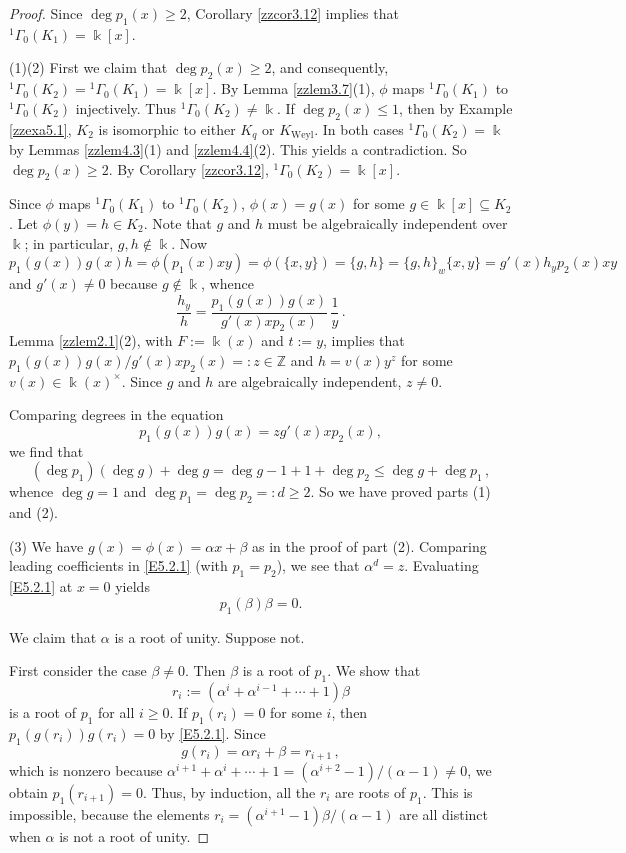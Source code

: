 \documentclass[12pt]{amsart}
\theoremstyle{plain}
\numberwithin{theorem}{section}
\numberwithin{equation}{theorem}
\theoremstyle{definition}
\newcommand{\ZZ}{\mathbb{Z}}
\DeclareMathOperator{\Weyl}{Weyl}
\newcommand \Kweyl {K_{\Weyl}}
\begin{document}
\begin{proof} 
Since $\deg p_1(x) \ge 2$, Corollary \ref{zzcor3.12} implies that 
${^1\Gamma}_{0}(K_1)=\Bbbk[x]$.

(1)(2) First we claim that $\deg p_2(x)\geq 2$, and consequently,
${^1\Gamma}_{0}(K_2)={^1\Gamma}_{0}(K_1)=\Bbbk[x]$.
By Lemma \ref{zzlem3.7}(1), $\phi$ maps 
${^1\Gamma}_{0}(K_1)$ to ${^1\Gamma}_0(K_2)$ injectively. 
Thus ${^1\Gamma}_{0}(K_2)\neq \Bbbk$. If $\deg p_2(x)\leq 1$,
then by Example \ref{zzexa5.1}, $K_2$ is isomorphic to either
$K_q$ or $\Kweyl$. In both cases ${^1\Gamma}_0(K_2)=\Bbbk$
by Lemmas \ref{zzlem4.3}(1) and \ref{zzlem4.4}(2). This 
yields a contradiction. So $\deg p_2(x)\geq 2$. By 
Corollary \ref{zzcor3.12}, ${^1\Gamma}_{0}(K_2)=\Bbbk[x]$.

Since $\phi$ maps ${^1\Gamma}_{0}(K_1)$ to ${^1\Gamma}_{0}(K_2)$, 
$\phi(x) = g(x)$ for some $g \in \Bbbk[x]\subseteq K_2$. 
Let $\phi(y)=h\in K_2$. Note that $g$ and $h$ must be 
algebraically independent over $\Bbbk$; in particular, 
$g,h \notin \Bbbk$. Now
$$p_1(g(x)) g(x) h = \phi(p_1(x) xy) = \phi(\{x,y\}) = \{g,h\} 
= \{g,h\}_w \{x,y\} = g'(x) h_y p_2(x) xy$$
and $g'(x) \ne 0$ because $g \notin \Bbbk$, whence
$$
\frac{h_y}{h} = \frac{p_1(g(x)) g(x)}{g'(x) x p_2(x)}\, \frac1y \,.
$$
Lemma \ref{zzlem2.1}(2), with $F := \Bbbk(x)$ and $t :=y$, 
implies that $p_1(g(x)) g(x)/ g'(x) x p_2(x) = :z \in \ZZ$ and 
$h = v(x) y^z$ for some $v(x) \in \Bbbk(x)^\times$. Since 
$g$ and $h$ are algebraically independent, $z \ne 0$.

Comparing degrees in the equation 
\begin{equation} 
\label{E5.2.1}\tag{E5.2.1}
p_1(g(x)) g(x) = z g'(x) x p_2(x),
\end{equation}
we find that
$$(\deg p_1)(\deg g) + \deg g = \deg g - 1 + 1 + \deg p_2\leq \deg g+\deg p_1 \,,$$
whence $\deg g = 1$ and $\deg p_1=\deg p_2=:d\geq 2$. So we have proved 
parts (1) and (2).

(3) We have $g(x) = \phi(x) = \alpha x + \beta$ as in the proof of part (2). Comparing leading coefficients in 
\eqref{E5.2.1} (with $p_1=p_2$), we see that $\alpha^d = z$. Evaluating \eqref{E5.2.1} at $x=0$ yields
$$p_1(\beta) \beta = 0.$$

We claim that $\alpha$ is a root of unity.  Suppose not.

First consider the case $\beta \ne 0$. Then $\beta$ is a root of 
$p_1$. We show that 
$$r_i := (\alpha^i + \alpha^{i-1} + \cdots + 1) \beta$$ 
is a root of $p_1$ for all $i \ge 0$. If $p_1(r_i) = 0$ for some $i$, 
then $p_1(g(r_i)) g(r_i) = 0$ by \eqref{E5.2.1}. Since 
$$g(r_i) = \alpha r_i + \beta = r_{i+1} \,,$$
which is nonzero because $\alpha^{i+1} + \alpha^i + \cdots + 1 
= (\alpha^{i+2}-1)/(\alpha-1) \ne 0$, we obtain $p_1(r_{i+1}) = 0$. 
Thus, by induction, all the $r_i$ are roots of $p_1$.  This is 
impossible, because the elements 
$r_i = (\alpha^{i+1}-1)\beta/(\alpha-1)$ are all distinct when 
$\alpha$ is not a root of unity.


\end{proof}
\end{document}
